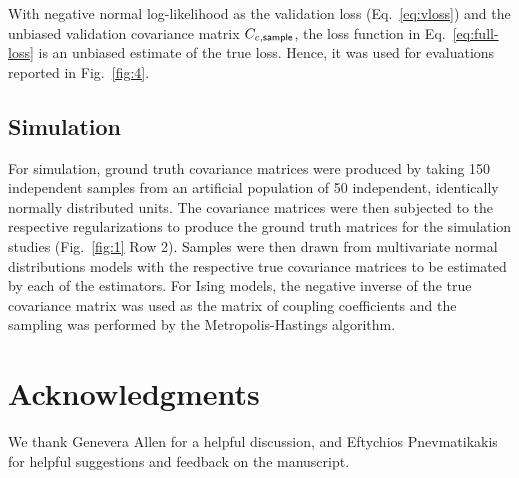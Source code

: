 With negative normal log-likelihood as the validation loss  (Eq.~\ref{eq:vloss}) and the unbiased validation covariance matrix $C_{c,\sf sample}$, the loss function in Eq.~\ref{eq:full-loss} is an unbiased estimate of the true loss. Hence, it was used for evaluations reported in Fig.~\ref{fig:4}.

\subsection*{Simulation}
For simulation, ground truth covariance matrices were produced by taking 150 independent samples from an artificial population of 50 independent, identically normally distributed units. The covariance matrices were then subjected to the respective regularizations to produce the ground truth matrices for the simulation studies (Fig.~\ref{fig:1} Row 2). Samples were then drawn from multivariate normal distributions models with the respective true covariance matrices to be estimated by each of the estimators. For Ising models, the negative inverse of the true covariance matrix was used as the matrix of coupling coefficients and the sampling was performed by the Metropolis-Hastings algorithm.


\section*{Acknowledgments}
We thank Genevera Allen for a helpful discussion, and Eftychios Pnevmatikakis for helpful suggestions and feedback on the manuscript.  

